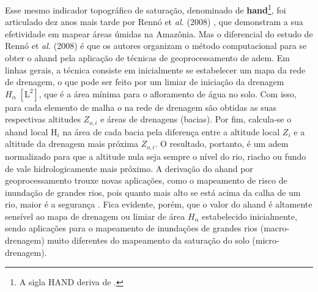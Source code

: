 \documentclass[./main.tex]{subfiles}
\begin{document}
\par Esse mesmo indicador topográfico de saturação, denominado de \textbf{\gls{hand}}\footnote{A sigla HAND deriva de .}, foi articulado dez anos mais tarde por Rennó et \textit{al.} (2008) \cite{Renno2008a}, que demonstram a sua efetividade em mapear áreas úmidas na Amazônia. Mas o diferencial do estudo de Rennó et \textit{al.} (2008) é que os autores organizam o método computacional para se obter o \acrshort{ahand} pela aplicação de técnicas de geoprocessamento de \acrshort{adem}. Em linhas gerais, a técnica consiste em inicialmente se estabelecer um mapa da rede de drenagem, o que pode ser feito por um limiar de iniciação da drenagem $H_{\alpha}\;[\text{L}^2]$, que é a área mínima para o afloramento de água no solo. Com isso, para cada elemento de malha $o$ na rede de drenagem são obtidas as suas respectivas altitudes $Z_{o, i}$ e áreas de drenagens (bacias). Por fim, calcula-se o \acrshort{ahand} local $\text{H}_i$ na área de cada bacia pela diferença entre a altitude local $Z_{i}$ e a altitude da drenagem mais próxima $Z_{o, i}$. O resultado, portanto, é um \acrlong{adem} normalizado para que a altitude nula seja sempre o nível do rio, riacho ou fundo de vale hidrologicamente mais próximo. A derivação do \acrshort{ahand} por geoprocessamento trouxe novas aplicações, como o mapeamento de risco de inundação de grandes rios, pois quanto mais alto se está acima da calha de um rio, maior é a segurança \cite{Nobre2016a}. Fica evidente, porém, que o valor do \acrshort{ahand} é altamente sensível ao mapa de drenagem ou limiar de área $H_{\alpha}$ estabelecido inicialmente, sendo aplicações para o mapeamento de inundações de grandes rios (macro-drenagem) muito diferentes do mapeamento da saturação do solo (micro-drenagem).
\end{document}
